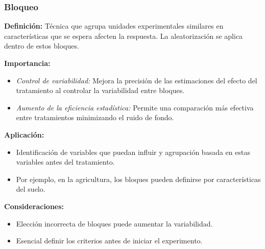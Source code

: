 ﻿\documentclass{beamer}
\begin{document}
\begin{frame}
\frametitle{Bloqueo}
\textbf{Definición:} Técnica que agrupa unidades experimentales similares en características que se espera afecten la respuesta. La aleatorización se aplica dentro de estos bloques.

\textbf{Importancia:}
\begin{itemize}
    \item \textit{Control de variabilidad:} Mejora la precisión de las estimaciones del efecto del tratamiento al controlar la variabilidad entre bloques.
    \item \textit{Aumento de la eficiencia estadística:} Permite una comparación más efectiva entre tratamientos minimizando el ruido de fondo.
\end{itemize}

\textbf{Aplicación:}
\begin{itemize}
    \item Identificación de variables que puedan influir y agrupación basada en estas variables antes del tratamiento.
    \item Por ejemplo, en la agricultura, los bloques pueden definirse por características del suelo.
\end{itemize}

\textbf{Consideraciones:}
\begin{itemize}
    \item Elección incorrecta de bloques puede aumentar la variabilidad.
    \item Esencial definir los criterios antes de iniciar el experimento.
\end{itemize}
\end{frame}
\end{document}
